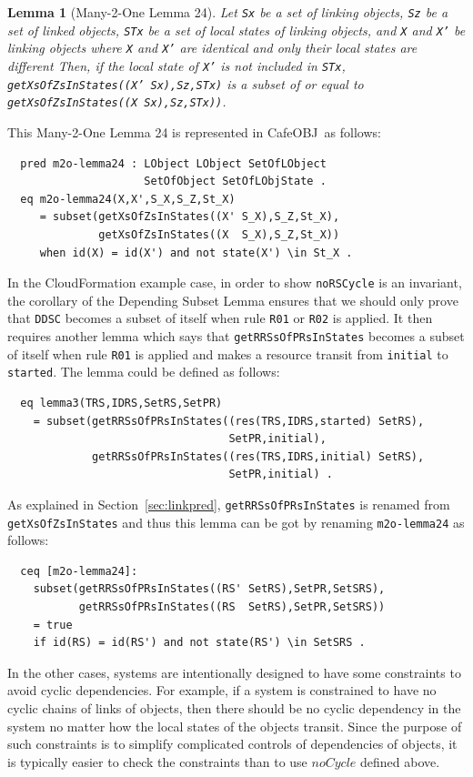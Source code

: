 \documentclass[12pt]{report}
\newtheorem{lemma}{Lemma}
\newcommand{\stt}[1]{{\small{\tt {#1}}}}
\newcommand{\cafeobj}{{\sf CafeOBJ}~}
\begin{document}
\begin{lemma}[Many-2-One Lemma 24]
  Let {\tt Sx} be a set of linking objects, {\tt Sz} be a set of
  linked objects, {\tt STx} be a set of local states of linking
  objects, and {\tt X} and {\tt X'} be linking objects where {\tt X}
  and {\tt X'} are identical and only their local states are different
  Then, if the local state of {\tt X'} is not included in {\tt STx},
  \stt{getXsOfZsInStates((X' Sx),Sz,STx)} is a subset of or equal to
  \stt{getXsOfZsInStates((X Sx),Sz,STx))}.
\end{lemma}
This Many-2-One Lemma 24 is represented in \cafeobj as follows:
\begin{verbatim}
  pred m2o-lemma24 : LObject LObject SetOfLObject
                     SetOfObject SetOfLObjState .
  eq m2o-lemma24(X,X',S_X,S_Z,St_X)
     = subset(getXsOfZsInStates((X' S_X),S_Z,St_X),
              getXsOfZsInStates((X  S_X),S_Z,St_X))
     when id(X) = id(X') and not state(X') \in St_X .
\end{verbatim}
In the CloudFormation example case, in order to show {\tt noRSCycle}
is an invariant, the corollary of the Depending Subset Lemma ensures
that we should only prove that {\tt DDSC} becomes a subset of itself
when rule {\tt R01} or {\tt R02} is applied. It then requires another
lemma which says that {\tt getRRSsOfPRsInStates} becomes a subset of
itself when rule {\tt R01} is applied and makes a resource transit
from {\tt initial} to {\tt started}.  The lemma could be defined as
follows:
\begin{verbatim}
  eq lemma3(TRS,IDRS,SetRS,SetPR)
    = subset(getRRSsOfPRsInStates((res(TRS,IDRS,started) SetRS),
                                  SetPR,initial), 
             getRRSsOfPRsInStates((res(TRS,IDRS,initial) SetRS),
                                  SetPR,initial) .
\end{verbatim}
As explained in Section~\ref{sec:linkpred}, {\tt getRRSsOfPRsInStates}
is renamed from {\tt getXsOfZsInStates} and thus this lemma can be got
by renaming {\tt m2o-lemma24} as follows:
\begin{verbatim}
  ceq [m2o-lemma24]:
    subset(getRRSsOfPRsInStates((RS' SetRS),SetPR,SetSRS),
           getRRSsOfPRsInStates((RS  SetRS),SetPR,SetSRS))
    = true
    if id(RS) = id(RS') and not state(RS') \in SetSRS .
\end{verbatim}

In the other cases, systems are intentionally designed to have some constraints
to avoid cyclic dependencies. For example, if a system is constrained to
have no cyclic chains of links of objects, then there should be no
cyclic dependency in the system no matter how the local states of the
objects transit. Since the purpose of such constraints is to simplify
complicated controls of dependencies of objects, it is typically easier
to check the constraints than to use $noCycle$ defined above.
\end{document}
